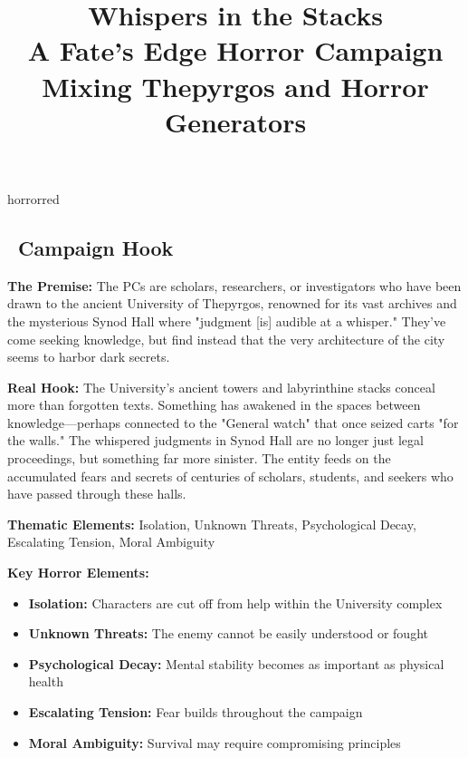 \documentclass[11pt]{article}
\title{\Huge\textbf{Whispers in the Stacks}\\
\Large A Fate's Edge Horror Campaign\\
\large Mixing Thepyrgos and Horror Generators}
\author{}
\date{}
\begin{document}
\maketitle

\begin{center}
\end{center}

\begin{campaignsection}{horrorred}
\subsection*{\faMap\ Campaign Hook}

\textbf{The Premise:} The PCs are scholars, researchers, or investigators who have been drawn to the ancient University of Thepyrgos, renowned for its vast archives and the mysterious Synod Hall where "judgment [is] audible at a whisper." They've come seeking knowledge, but find instead that the very architecture of the city seems to harbor dark secrets.

\textbf{Real Hook:} The University's ancient towers and labyrinthine stacks conceal more than forgotten texts. Something has awakened in the spaces between knowledge—perhaps connected to the "General watch" that once seized carts "for the walls." The whispered judgments in Synod Hall are no longer just legal proceedings, but something far more sinister. The entity feeds on the accumulated fears and secrets of centuries of scholars, students, and seekers who have passed through these halls.

\textbf{Thematic Elements:} Isolation, Unknown Threats, Psychological Decay, Escalating Tension, Moral Ambiguity

\textbf{Key Horror Elements:}
\begin{itemize}
    \item \textbf{Isolation:} Characters are cut off from help within the University complex
    \item \textbf{Unknown Threats:} The enemy cannot be easily understood or fought
    \item \textbf{Psychological Decay:} Mental stability becomes as important as physical health
    \item \textbf{Escalating Tension:} Fear builds throughout the campaign
    \item \textbf{Moral Ambiguity:} Survival may require compromising principles
\end{itemize}
\end{campaignsection}
\end{document}

